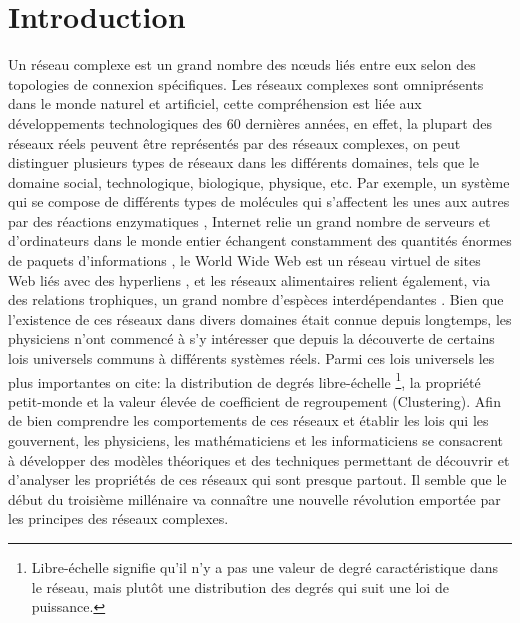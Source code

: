 %
%
\chapter*{Introduction}
Un réseau complexe est un grand nombre des nœuds liés entre eux selon des topologies de connexion spécifiques. Les réseaux complexes sont omniprésents dans le monde naturel et artificiel, cette compréhension est liée aux développements technologiques des $60$ dernières années, en effet,  la plupart des réseaux réels peuvent être représentés par des réseaux complexes, on peut distinguer plusieurs types de réseaux dans les différents domaines, tels que le domaine social, technologique, biologique, physique, etc. Par exemple, un système qui se compose de différents types de molécules qui s'affectent les unes aux autres par des réactions enzymatiques \cite{Je-al2000}, Internet  relie un grand nombre de serveurs et d'ordinateurs dans le monde entier échangent constamment des quantités énormes de paquets d'informations \cite{F-al1999}, le World Wide Web est un réseau virtuel de sites Web liés avec des hyperliens \cite{BA1999}, et les réseaux alimentaires relient également, via des relations trophiques, un grand nombre d'espèces interdépendantes \cite{Co-al1990,Pim-al2002}. Bien que l'existence de ces réseaux dans divers domaines était connue depuis longtemps, les physiciens n'ont commencé à s'y intéresser que depuis la découverte de certains lois universels communs à différents systèmes réels. Parmi ces lois universels les plus importantes on cite: 
\textsf{la distribution de degrés} libre-échelle \footnote{ Libre-échelle signifie qu'il n'y a pas une valeur de degré caractéristique dans le réseau, mais plutôt une distribution des degrés qui suit une loi de puissance.},
la propriété \textsf{petit-monde}  
et la valeur élevée de \textsf{coefficient de regroupement} (Clustering). Afin de bien comprendre les comportements de ces réseaux et établir les lois qui les gouvernent, les physiciens, les mathématiciens et les informaticiens se consacrent à développer des modèles théoriques et des techniques permettant de découvrir  et d'analyser les propriétés de ces réseaux qui sont presque partout. Il semble que le début du troisième millénaire va connaître une nouvelle révolution emportée par les principes des réseaux complexes.\\


